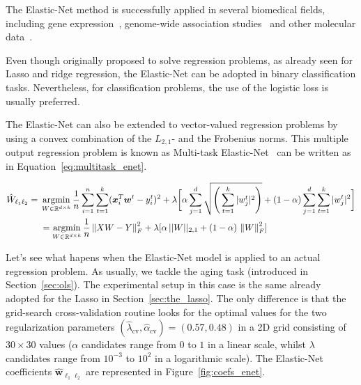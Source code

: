 			The Elastic-Net method is successfully applied in several biomedical fields, including gene expression~\cite{jacob2015robust, de2009regularized}, genome-wide association studies~\cite{waldmann2013evaluation} and other molecular data~\cite{aben2016tandem, jacob2015robust}.

			Even though originally proposed to solve regression problems, as already seen for Lasso and ridge regression, the Elastic-Net can be adopted in binary classification tasks. Nevertheless, for classification problems, the use of the logistic loss is usually preferred.

			The Elastic-Net can also be extended to vector-valued regression problems by using a convex combination of the $L_{2,1}$- and the Frobenius norms. This multiple output regression problem is known as Multi-task Elastic-Net~\cite{chen2012adaptive} can be written as in Equation~\eqref{eq:multitask_enet}.

			\begin{equation} \label{eq:multitask_enet}
				\begin{aligned}
					\hat W_{\ell_1\ell_2}={} & \mathop{\mathrm{argmin}}\limits_{W \in \mathbb{R}^{d \times k}} \frac{1}{n} \sum_{i=1}^n \sum_{t=1}^k (\bm{x}_i^T\bm{w}^t - y_i^t)^2 + \lambda \bigg[ \alpha \sum_{j=1}^d \sqrt{\Bigg(\sum_{t=1}^k |w_j^t|^2\Bigg)} + (1-\alpha)  \sum_{j=1}^d \sum_{t=1}^k |w_j^t|^2 \bigg] \\
					& =	\mathop{\mathrm{argmin}}\limits_{W \in \mathbb{R}^{d \times k}} \frac{1}{n} \left\lVert XW - Y\right\rVert_F^2 + \lambda [\alpha\,||W||_{2,1} + (1-\alpha)\,\left\lVert W\right\rVert_F^2]
				\end{aligned}
   		\end{equation}

			Let's see what hapens when the Elastic-Net model is applied to an actual regression problem. As usually, we tackle the aging task (introduced in Section~\ref{sec:ols}).
			The experimental setup in this case is the same already adopted for the Lasso in Section~\ref{sec:the_lasso}. The only difference is that the grid-search cross-validation routine looks for the optimal values for the two regularization parameters $(\hat \lambda_{\text{cv}}, \hat \alpha_{\text{cv}}) = (0.57, 0.48)$ in a 2D grid consisting of $30 \times 30$ values ($\alpha$ candidates range from $0$ to $1$ in a linear scale, whilst $\lambda$ candidates range from $10^{-3}$ to $10^{2}$ in a logarithmic scale). The Elastic-Net coefficients $\bm{\hat w}_{\ell_1\ell_2}$ are represented in Figure~\ref{fig:coefs_enet}.

